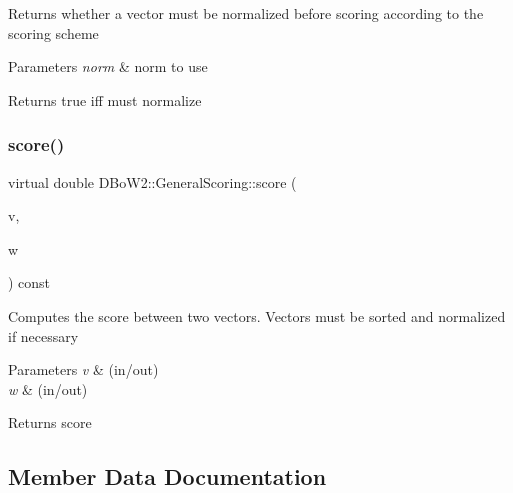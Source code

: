 Returns whether a vector must be normalized before scoring according to the scoring scheme 
\begin{DoxyParams}{Parameters}
{\em norm} & norm to use \\
\hline
\end{DoxyParams}
\begin{DoxyReturn}{Returns}
true iff must normalize 
\end{DoxyReturn}
\mbox{\label{class_d_bo_w2_1_1_general_scoring_a43b3f5fedb19e6a19e17b9813efd17e8}} 
\subsubsection{\texorpdfstring{score()}{score()}}
{\footnotesize\ttfamily virtual double D\+Bo\+W2\+::\+General\+Scoring\+::score (\begin{DoxyParamCaption}\item[{const \mbox{\hyperlink{class_d_bo_w2_1_1_bow_vector}{Bow\+Vector}} \&}]{v,  }\item[{const \mbox{\hyperlink{class_d_bo_w2_1_1_bow_vector}{Bow\+Vector}} \&}]{w }\end{DoxyParamCaption}) const\hspace{0.3cm}{\ttfamily [pure virtual]}}

Computes the score between two vectors. Vectors must be sorted and normalized if necessary 
\begin{DoxyParams}{Parameters}
{\em v} & (in/out) \\
\hline
{\em w} & (in/out) \\
\hline
\end{DoxyParams}
\begin{DoxyReturn}{Returns}
score 
\end{DoxyReturn}


\subsection{Member Data Documentation}
\mbox{\label{class_d_bo_w2_1_1_general_scoring_af470bccf750689525622f216f07d6f3c}} 
